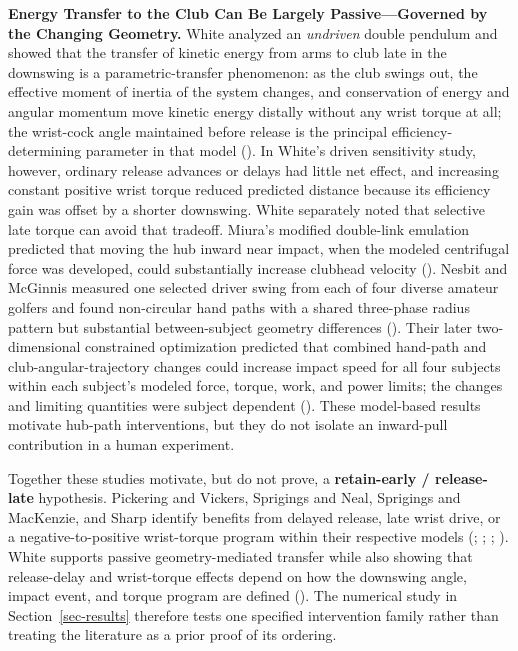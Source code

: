 \documentclass[
  letterpaper,
]{report}
\begin{document}
\textbf{Energy Transfer to the Club Can Be Largely Passive---Governed by
the Changing Geometry.} White analyzed an \emph{undriven} double
pendulum and showed that the transfer of kinetic energy from arms to
club late in the downswing is a parametric-transfer phenomenon: as the
club swings out, the effective moment of inertia of the system changes,
and conservation of energy and angular momentum move kinetic energy
distally without any wrist torque at all; the wrist-cock angle
maintained before release is the principal efficiency-determining
parameter in that model (). In
White's driven sensitivity study, however, ordinary release advances or
delays had little net effect, and increasing constant positive wrist
torque reduced predicted distance because its efficiency gain was offset
by a shorter downswing. White separately noted that selective late
torque can avoid that tradeoff. Miura's modified double-link emulation
predicted that moving the hub inward near impact, when the modeled
centrifugal force was developed, could substantially increase clubhead
velocity (). Nesbit and McGinnis
measured one selected driver swing from each of four diverse amateur
golfers and found non-circular hand paths with a shared three-phase
radius pattern but substantial between-subject geometry differences
(). Their later
two-dimensional constrained optimization predicted that combined
hand-path and club-angular-trajectory changes could increase impact
speed for all four subjects within each subject's modeled force, torque,
work, and power limits; the changes and limiting quantities were subject
dependent ().
These model-based results motivate hub-path interventions, but they do
not isolate an inward-pull contribution in a human experiment.

Together these studies motivate, but do not prove, a
\textbf{retain-early / release-late} hypothesis. Pickering and Vickers,
Sprigings and Neal, Sprigings and MacKenzie, and Sharp identify benefits
from delayed release, late wrist drive, or a negative-to-positive
wrist-torque program within their respective models
(;
;
;
). White supports passive
geometry-mediated transfer while also showing that release-delay and
wrist-torque effects depend on how the downswing angle, impact event,
and torque program are defined ().
The numerical study in Section~\ref{sec-results} therefore tests one
specified intervention family rather than treating the literature as a
prior proof of its ordering.
\end{document}
